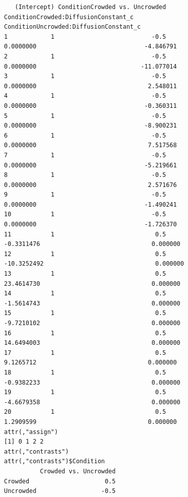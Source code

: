 \documentclass[
]{article}
\begin{document}
\begin{verbatim}
   (Intercept) ConditionCrowded vs. Uncrowded ConditionCrowded:DiffusionConstant_c ConditionUncrowded:DiffusionConstant_c
1            1                           -0.5                            0.0000000                              -4.846791
2            1                           -0.5                            0.0000000                             -11.077014
3            1                           -0.5                            0.0000000                               2.548011
4            1                           -0.5                            0.0000000                              -0.360311
5            1                           -0.5                            0.0000000                              -8.900231
6            1                           -0.5                            0.0000000                               7.517568
7            1                           -0.5                            0.0000000                              -5.219661
8            1                           -0.5                            0.0000000                               2.571676
9            1                           -0.5                            0.0000000                              -1.490241
10           1                           -0.5                            0.0000000                              -1.726370
11           1                            0.5                           -0.3311476                               0.000000
12           1                            0.5                          -10.3252492                               0.000000
13           1                            0.5                           23.4614730                               0.000000
14           1                            0.5                           -1.5614743                               0.000000
15           1                            0.5                           -9.7210102                               0.000000
16           1                            0.5                           14.6494003                               0.000000
17           1                            0.5                            9.1265712                               0.000000
18           1                            0.5                           -0.9382233                               0.000000
19           1                            0.5                           -4.6679358                               0.000000
20           1                            0.5                            1.2909599                               0.000000
attr(,"assign")
[1] 0 1 2 2
attr(,"contrasts")
attr(,"contrasts")$Condition
          Crowded vs. Uncrowded
Crowded                     0.5
Uncrowded                  -0.5
\end{verbatim}
\end{document}
